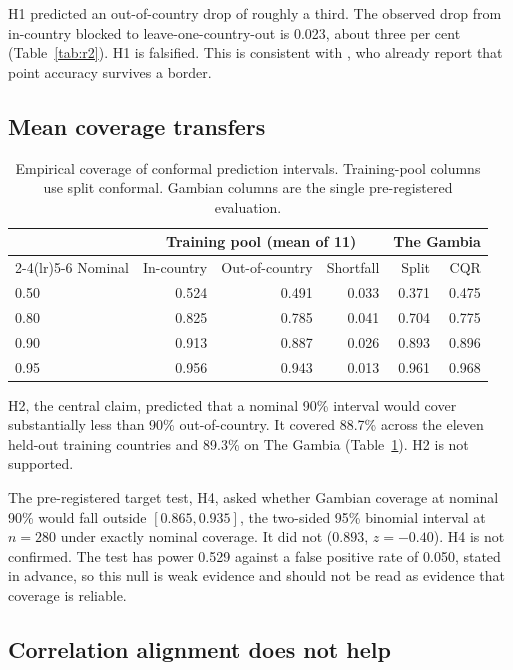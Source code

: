 \documentclass[11pt]{article}
\begin{document}
H1 predicted an out-of-country drop of roughly a third. The observed drop from
in-country blocked to leave-one-country-out is 0.023, about three per cent
(Table~\ref{tab:r2}). H1 is falsified. This is consistent with \citet{yeh2020},
who already report that point accuracy survives a border.

\subsection{Mean coverage transfers}

\begin{table}[t]
\centering
\small
\begin{tabular}{lrrrrr}
\toprule
& \multicolumn{3}{c}{Training pool (mean of 11)} & \multicolumn{2}{c}{The Gambia} \\
\cmidrule(lr){2-4}\cmidrule(lr){5-6}
Nominal & In-country & Out-of-country & Shortfall & Split & CQR \\
\midrule
0.50 & 0.524 & 0.491 & 0.033 & 0.371 & 0.475 \\
0.80 & 0.825 & 0.785 & 0.041 & 0.704 & 0.775 \\
0.90 & 0.913 & 0.887 & 0.026 & 0.893 & 0.896 \\
0.95 & 0.956 & 0.943 & 0.013 & 0.961 & 0.968 \\
\bottomrule
\end{tabular}
\caption{Empirical coverage of conformal prediction intervals. Training-pool
columns use split conformal. Gambian columns are the single pre-registered
evaluation.}
\label{tab:cov}
\end{table}

H2, the central claim, predicted that a nominal 90\% interval would cover
substantially less than 90\% out-of-country. It covered 88.7\% across the eleven
held-out training countries and 89.3\% on The Gambia (Table~\ref{tab:cov}). H2 is
not supported.

The pre-registered target test, H4, asked whether Gambian coverage at nominal
90\% would fall outside $[0.865, 0.935]$, the two-sided 95\% binomial interval at
$n = 280$ under exactly nominal coverage. It did not ($0.893$, $z = -0.40$). H4 is
not confirmed. The test has power 0.529 against a false positive rate of 0.050,
stated in advance, so this null is weak evidence and should not be read as
evidence that coverage is reliable.

\subsection{Correlation alignment does not help}
\end{document}
